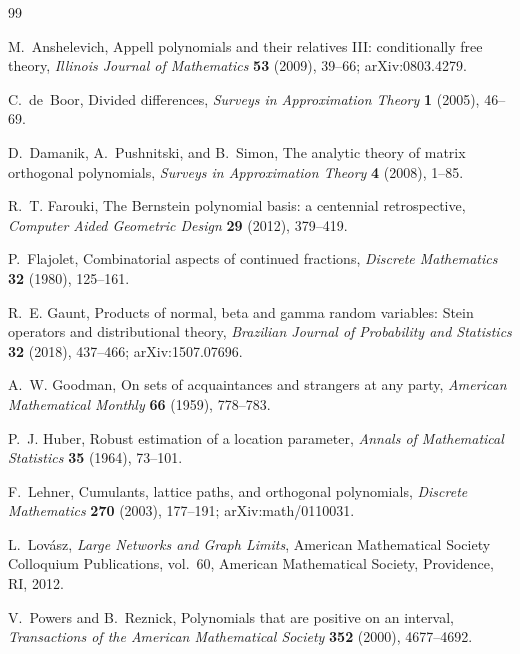 \documentclass[11pt]{article}
\begin{document}
\begin{thebibliography}{99}

M.~Anshelevich,
\newblock Appell polynomials and their relatives III: conditionally free theory,
\newblock \emph{Illinois Journal of Mathematics} \textbf{53} (2009), 39--66;
\newblock arXiv:0803.4279.

C.~de~Boor,
\newblock Divided differences,
\newblock \emph{Surveys in Approximation Theory} \textbf{1} (2005), 46--69.

D.~Damanik, A.~Pushnitski, and B.~Simon,
\newblock The analytic theory of matrix orthogonal polynomials,
\newblock \emph{Surveys in Approximation Theory} \textbf{4} (2008), 1--85.

R.~T. Farouki,
\newblock The Bernstein polynomial basis: a centennial retrospective,
\newblock \emph{Computer Aided Geometric Design} \textbf{29} (2012),
379--419.

P.~Flajolet,
\newblock Combinatorial aspects of continued fractions,
\newblock \emph{Discrete Mathematics} \textbf{32} (1980), 125--161.

R.~E. Gaunt,
\newblock Products of normal, beta and gamma random variables: Stein
operators and distributional theory,
\newblock \emph{Brazilian Journal of Probability and Statistics}
\textbf{32} (2018), 437--466;
\newblock arXiv:1507.07696.

A.~W. Goodman,
\newblock On sets of acquaintances and strangers at any party,
\newblock \emph{American Mathematical Monthly} \textbf{66} (1959),
778--783.

P.~J. Huber,
\newblock Robust estimation of a location parameter,
\newblock \emph{Annals of Mathematical Statistics} \textbf{35} (1964),
73--101.

F.~Lehner,
\newblock Cumulants, lattice paths, and orthogonal polynomials,
\newblock \emph{Discrete Mathematics} \textbf{270} (2003), 177--191;
\newblock arXiv:math/0110031.

L.~Lov\'asz,
\newblock \emph{Large Networks and Graph Limits},
\newblock American Mathematical Society Colloquium Publications, vol.~60,
American Mathematical Society, Providence, RI, 2012.

V.~Powers and B.~Reznick,
\newblock Polynomials that are positive on an interval,
\newblock \emph{Transactions of the American Mathematical Society}
\textbf{352} (2000), 4677--4692.


\end{thebibliography}
\end{document}
